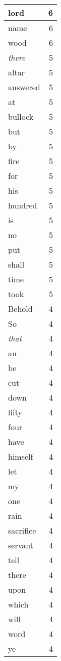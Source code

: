 \begin{center}
\begin{longtable}{l|r}
lord & 6 \\ \hline
name & 6 \\ \hline
wood & 6 \\ \hline
\emph{there} & 5 \\ \hline
altar & 5 \\ \hline
answered & 5 \\ \hline
at & 5 \\ \hline
bullock & 5 \\ \hline
but & 5 \\ \hline
by & 5 \\ \hline
fire & 5 \\ \hline
for & 5 \\ \hline
his & 5 \\ \hline
hundred & 5 \\ \hline
is & 5 \\ \hline
no & 5 \\ \hline
put & 5 \\ \hline
shall & 5 \\ \hline
time & 5 \\ \hline
took & 5 \\ \hline
Behold & 4 \\ \hline
So & 4 \\ \hline
\emph{that} & 4 \\ \hline
an & 4 \\ \hline
be & 4 \\ \hline
cut & 4 \\ \hline
down & 4 \\ \hline
fifty & 4 \\ \hline
four & 4 \\ \hline
have & 4 \\ \hline
himself & 4 \\ \hline
let & 4 \\ \hline
my & 4 \\ \hline
one & 4 \\ \hline
rain & 4 \\ \hline
sacrifice & 4 \\ \hline
servant & 4 \\ \hline
tell & 4 \\ \hline
there & 4 \\ \hline
upon & 4 \\ \hline
which & 4 \\ \hline
will & 4 \\ \hline
word & 4 \\ \hline
ye & 4 \\ \hline

\end{longtable}
\end{center}
